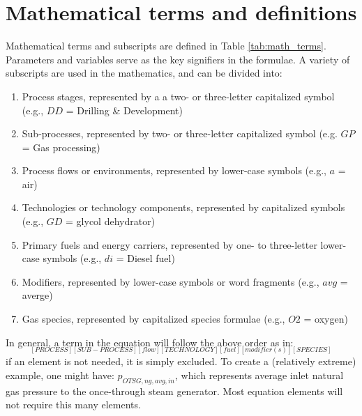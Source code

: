 \documentclass[11pt]{report}
\begin{document}

\chapter{Mathematical terms and definitions}

Mathematical terms and subscripts are defined in Table \ref{tab:math_terms}. Parameters and variables serve as the key signifiers in the formulae. A variety of subscripts are used in the mathematics, and can be divided into: 
\begin{enumerate}
\item Process stages, represented by a a two- or three-letter capitalized symbol (e.g., $DD$ = Drilling \& Development)
\item Sub-processes, represented by two- or three-letter capitalized symbol (e.g. $GP$ = Gas processing)
\item Process flows or environments, represented by lower-case symbols (e.g., $a$ = air)
\item Technologies or technology components, represented by capitalized symbols (e.g., $GD$ = glycol dehydrator)
\item Primary fuels and energy carriers, represented by one- to three-letter lower-case symbols (e.g., $di$ = Diesel fuel)
\item Modifiers, represented by lower-case symbols or word fragments (e.g., $avg$ = averge)
\item Gas species, represented by capitalized species formulae (e.g., $O2$ = oxygen)
\end{enumerate} 
In general, a term in the equation will follow the above order as in:
\begin{equation}
[Param]_{[PROCESS][SUB-PROCESS][flow][TECHNOLOGY][fuel][modifier(s)][SPECIES]}
\end{equation}
if an element is not needed, it is simply excluded. To create a (relatively extreme) example, one might have: $p_{OTSG,ng,avg,in}$, which represents average inlet natural gas pressure to the once-through steam generator. Most equation elements will not require this many elements.
\end{document}
